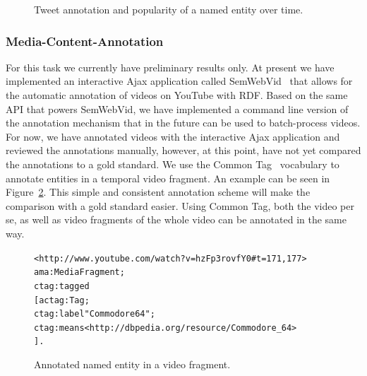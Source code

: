 \documentclass[runningheads,a4paper]{llncs}
\newenvironment{code}[1]
{\begin{lrbox}{\inverbatim}\begin{minipage}{12cm}\begin{alltt}{#1}}
{\end{alltt}\end{minipage}\end{lrbox}\colorbox{lightgray}{\usebox{\inverbatim}}}
\begin{document}
\begin{figure}[htb!]
  \begin{center}
\hspace{5pt}
  \caption{Tweet annotation and popularity of a named entity over time.}
  \label{fig:overtime}
  \end{center}  
\end{figure}

\subsubsection{Media-Content-Annotation}
For this task we currently have preliminary results only. At present we have implemented an interactive Ajax application called SemWebVid~\cite{semwebvid} that allows for the automatic annotation of videos on YouTube with RDF. Based on the same API that powers SemWebVid, we have implemented a command line version of the annotation mechanism that in the future can be used to batch-process videos. For now, we have annotated videos with the interactive Ajax application and reviewed the annotations manually, however, at this point, have not yet compared the annotations to a gold standard. We use the Common Tag~\cite{CommonTag:Spec} vocabulary to annotate entities in a temporal video fragment. An example can be seen in Figure~\ref{code:ctag}. This simple and consistent annotation scheme will make the comparison with a gold standard easier. Using Common Tag, both the video per se, as well as video fragments of the whole video can be annotated in the same way.

\begin{figure}[htbp!]
\begin{center}
{\footnotesize
\begin{code}
<http://www. youtube.com/watch?v=hzFp3rovfY0#t=171,177>
  a ma:MediaFragment ;
  ctag:tagged
    [ a ctag:Tag ;
      ctag:label "Commodore 64" ;
      ctag:means <http://dbpedia.org/resource/Commodore_64>
    ] .
\end{code}}
  \caption[Annotated named entity in a video fragment.]{Annotated named entity in a video fragment.}
  \label{code:ctag} 
  \end{center}  
\end{figure}
\end{document}

